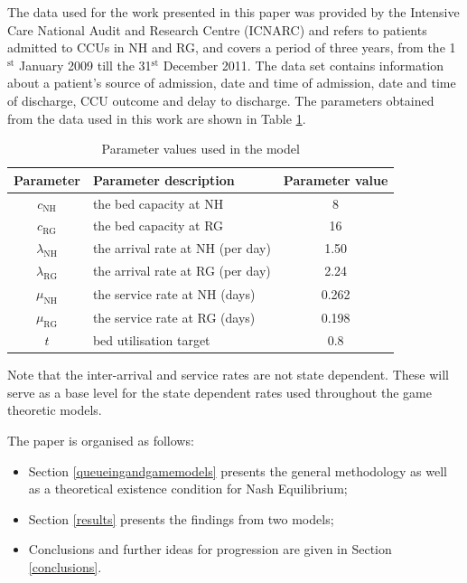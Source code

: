 \documentclass{article}
\newcommand{\NH}{\text{NH}}
\newcommand{\RG}{\text{RG}}
\begin{document}
The data used for the work presented in this paper was provided by the Intensive Care National Audit and Research Centre (ICNARC) and refers to patients admitted to CCUs in NH and RG, and covers a period of three years, from the 1$^{\text{st}}$ January 2009 till the 31$^{\text{st}}$ December 2011.
The data set contains information about a patient's source of admission, date and time of admission, date and time of discharge, CCU outcome and delay to discharge.
The parameters obtained from the data used in this work are shown in Table \ref{parameter_values_model_1}.

\begin{table}[!htbp]
\begin{center}
\begin{tabular}{c|lc}
\toprule
Parameter&Parameter description&Parameter value\\
\midrule
$c_{\NH}$&the bed capacity at NH&8\\
$c_{\RG}$&the bed capacity at RG&16\\
$\lambda_{\NH}$&the arrival rate at NH (per day)&1.50 \\
$\lambda_{\RG}$&the arrival rate at RG (per day)&2.24\\
$\mu_{\NH}$&the service rate at NH (days)&0.262\\
$\mu_{\RG}$&the service rate at RG (days)&0.198\\
$t$& bed utilisation target & 0.8\\
\bottomrule
\end{tabular}
\end{center}
\caption{Parameter values used in the model}\label{parameter_values_model_1}
\end{table}

Note that the inter-arrival and service rates are not state dependent.
These will serve as a base level for the state dependent rates used throughout the game theoretic models.

The paper is organised as follows:
\begin{itemize}
    \item Section \ref{queueingandgamemodels} presents the general methodology as well as a theoretical existence condition for Nash Equilibrium;
    \item Section \ref{results} presents the findings from two models;
    \item Conclusions and further ideas for progression are given in Section \ref{conclusions}.
\end{itemize}
\end{document}
